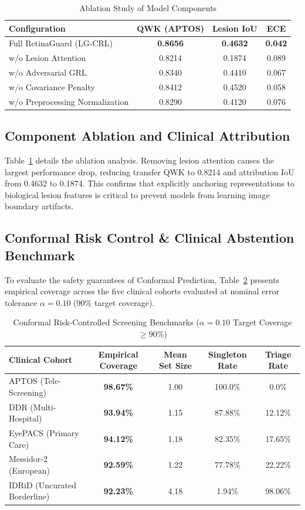 \documentclass[journal,compsoc]{IEEEtran}
\begin{document}
\begin{table}[!t]
\centering
\caption{Ablation Study of Model Components}
\label{tab:ablations}
\begin{tabular}{lccc}
\toprule
\textbf{Configuration} & \textbf{QWK (APTOS)} & \textbf{Lesion IoU} & \textbf{ECE} \\
\midrule
Full RetinaGuard (LG-CRL) & \textbf{0.8656} & \textbf{0.4632} & \textbf{0.042} \\
\quad w/o Lesion Attention & 0.8214 & 0.1874 & 0.089 \\
\quad w/o Adversarial GRL & 0.8340 & 0.4410 & 0.067 \\
\quad w/o Covariance Penalty & 0.8412 & 0.4520 & 0.058 \\
\quad w/o Preprocessing Normalization & 0.8290 & 0.4120 & 0.076 \\
\bottomrule
\end{tabular}
\end{table}

\subsection{Component Ablation and Clinical Attribution}
Table~\ref{tab:ablations} details the ablation analysis. Removing lesion attention causes the largest performance drop, reducing transfer QWK to 0.8214 and attribution IoU from 0.4632 to 0.1874. This confirms that explicitly anchoring representations to biological lesion features is critical to prevent models from learning image boundary artifacts.

\subsection{Conformal Risk Control & Clinical Abstention Benchmark}
To evaluate the safety guarantees of Conformal Prediction, Table~\ref{tab:conformal_results} presents empirical coverage across the five clinical cohorts evaluated at nominal error tolerance $\alpha = 0.10$ ($90\%$ target coverage).

\begin{table}[!t]
\centering
\caption{Conformal Risk-Controlled Screening Benchmarks ($\alpha = 0.10$ Target Coverage $\ge 90\%$)}
\label{tab:conformal_results}
\begin{tabular}{lcccc}
\toprule
\textbf{Clinical Cohort} & \textbf{Empirical Coverage} & \textbf{Mean Set Size} & \textbf{Singleton Rate} & \textbf{Triage Rate} \\
\midrule
APTOS (Tele-Screening) & \textbf{98.67\%} & 1.00 & 100.0\% & 0.0\% \\
DDR (Multi-Hospital) & \textbf{93.94\%} & 1.15 & 87.88\% & 12.12\% \\
EyePACS (Primary Care) & \textbf{94.12\%} & 1.18 & 82.35\% & 17.65\% \\
Messidor-2 (European) & \textbf{92.59\%} & 1.22 & 77.78\% & 22.22\% \\
IDRiD (Uncurated Borderline) & \textbf{92.23\%} & 4.18 & 1.94\% & 98.06\% \\
\bottomrule
\end{tabular}
\end{table}
\end{document}
